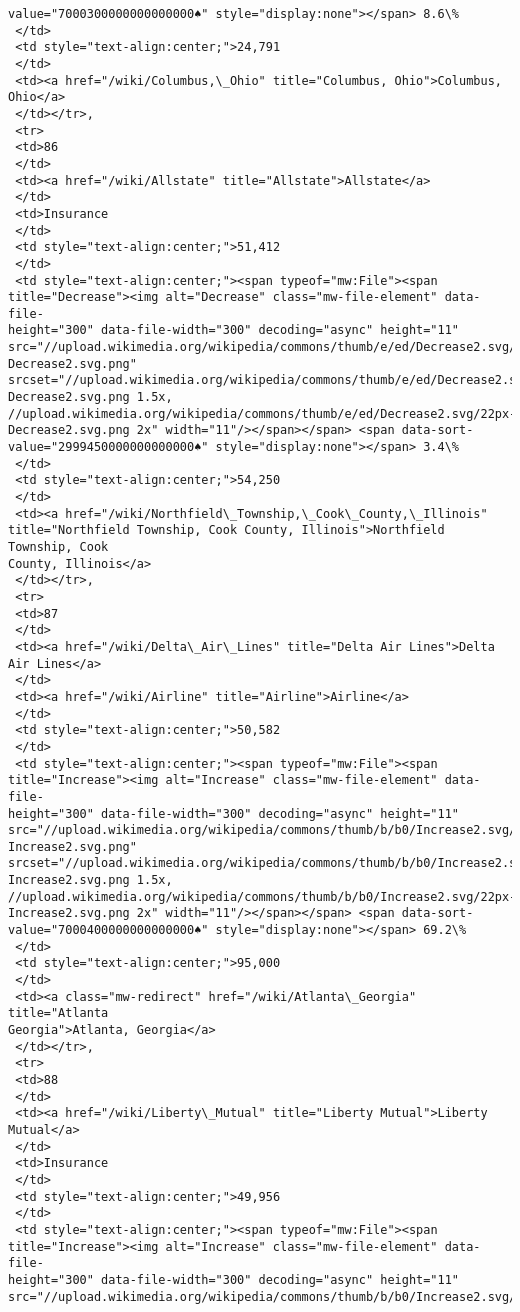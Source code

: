 \documentclass[11pt]{article}
\begin{document}
\begin{tcolorbox}[breakable, size=fbox, boxrule=.5pt, pad at break*=1mm, opacityfill=0]
\begin{Verbatim}[commandchars=\\\{\}]
value="7000300000000000000♠" style="display:none"></span> 8.6\%
 </td>
 <td style="text-align:center;">24,791
 </td>
 <td><a href="/wiki/Columbus,\_Ohio" title="Columbus, Ohio">Columbus, Ohio</a>
 </td></tr>,
 <tr>
 <td>86
 </td>
 <td><a href="/wiki/Allstate" title="Allstate">Allstate</a>
 </td>
 <td>Insurance
 </td>
 <td style="text-align:center;">51,412
 </td>
 <td style="text-align:center;"><span typeof="mw:File"><span
title="Decrease"><img alt="Decrease" class="mw-file-element" data-file-
height="300" data-file-width="300" decoding="async" height="11"
src="//upload.wikimedia.org/wikipedia/commons/thumb/e/ed/Decrease2.svg/11px-
Decrease2.svg.png"
srcset="//upload.wikimedia.org/wikipedia/commons/thumb/e/ed/Decrease2.svg/17px-
Decrease2.svg.png 1.5x,
//upload.wikimedia.org/wikipedia/commons/thumb/e/ed/Decrease2.svg/22px-
Decrease2.svg.png 2x" width="11"/></span></span> <span data-sort-
value="2999450000000000000♠" style="display:none"></span> 3.4\%
 </td>
 <td style="text-align:center;">54,250
 </td>
 <td><a href="/wiki/Northfield\_Township,\_Cook\_County,\_Illinois"
title="Northfield Township, Cook County, Illinois">Northfield Township, Cook
County, Illinois</a>
 </td></tr>,
 <tr>
 <td>87
 </td>
 <td><a href="/wiki/Delta\_Air\_Lines" title="Delta Air Lines">Delta Air Lines</a>
 </td>
 <td><a href="/wiki/Airline" title="Airline">Airline</a>
 </td>
 <td style="text-align:center;">50,582
 </td>
 <td style="text-align:center;"><span typeof="mw:File"><span
title="Increase"><img alt="Increase" class="mw-file-element" data-file-
height="300" data-file-width="300" decoding="async" height="11"
src="//upload.wikimedia.org/wikipedia/commons/thumb/b/b0/Increase2.svg/11px-
Increase2.svg.png"
srcset="//upload.wikimedia.org/wikipedia/commons/thumb/b/b0/Increase2.svg/17px-
Increase2.svg.png 1.5x,
//upload.wikimedia.org/wikipedia/commons/thumb/b/b0/Increase2.svg/22px-
Increase2.svg.png 2x" width="11"/></span></span> <span data-sort-
value="7000400000000000000♠" style="display:none"></span> 69.2\%
 </td>
 <td style="text-align:center;">95,000
 </td>
 <td><a class="mw-redirect" href="/wiki/Atlanta\_Georgia" title="Atlanta
Georgia">Atlanta, Georgia</a>
 </td></tr>,
 <tr>
 <td>88
 </td>
 <td><a href="/wiki/Liberty\_Mutual" title="Liberty Mutual">Liberty Mutual</a>
 </td>
 <td>Insurance
 </td>
 <td style="text-align:center;">49,956
 </td>
 <td style="text-align:center;"><span typeof="mw:File"><span
title="Increase"><img alt="Increase" class="mw-file-element" data-file-
height="300" data-file-width="300" decoding="async" height="11"
src="//upload.wikimedia.org/wikipedia/commons/thumb/b/b0/Increase2.svg/11px-

\end{Verbatim}
\end{tcolorbox}
\end{document}
